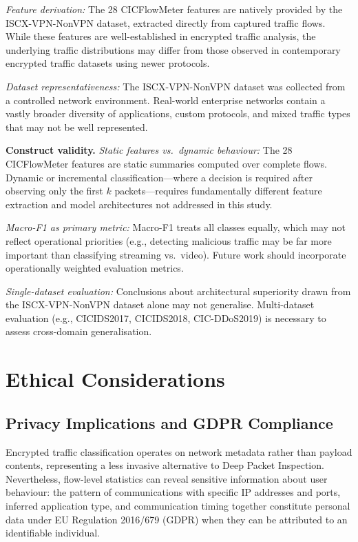 \documentclass[conference]{IEEEtran}
\begin{document}
\textit{Feature derivation:} The 28 CICFlowMeter features are natively provided
by the ISCX-VPN-NonVPN dataset, extracted directly from captured traffic flows.
While these features are well-established in encrypted traffic analysis, the
underlying traffic distributions may differ from those observed in contemporary
encrypted traffic datasets using newer protocols.

\textit{Dataset representativeness:} The ISCX-VPN-NonVPN dataset was collected
from a controlled network environment. Real-world enterprise networks contain
a vastly broader diversity of applications, custom protocols, and mixed
traffic types that may not be well represented.

\textbf{Construct validity.}
\textit{Static features vs.\ dynamic behaviour:} The 28 CICFlowMeter features
are static summaries computed over complete flows. Dynamic or incremental
classification---where a decision is required after observing only the first
$k$ packets---requires fundamentally different feature extraction and model
architectures not addressed in this study.

\textit{Macro-F1 as primary metric:} Macro-F1 treats all classes equally,
which may not reflect operational priorities (e.g., detecting malicious traffic
may be far more important than classifying streaming vs.\ video). Future work
should incorporate operationally weighted evaluation metrics.

\textit{Single-dataset evaluation:} Conclusions about architectural superiority
drawn from the ISCX-VPN-NonVPN dataset alone may not generalise. Multi-dataset
evaluation (e.g., CICIDS2017, CICIDS2018, CIC-DDoS2019) is necessary
to assess cross-domain generalisation.

\section{Ethical Considerations}
\label{sec:ethics}

\subsection{Privacy Implications and GDPR Compliance}

Encrypted traffic classification operates on network metadata rather than
payload contents, representing a less invasive alternative to Deep Packet
Inspection. Nevertheless, flow-level statistics can reveal sensitive information
about user behaviour: the pattern of communications with specific IP addresses
and ports, inferred application type, and communication timing together
constitute personal data under EU Regulation 2016/679 (GDPR) when they can
be attributed to an identifiable individual.
\end{document}
